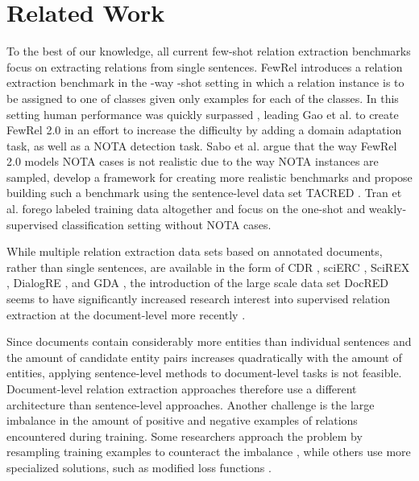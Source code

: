 \documentclass[11pt]{article}
\begin{document}
\section{Related Work}
\label{sec:related_work}

To the best of our knowledge, all current few-shot relation extraction benchmarks \cite{han_fewrel_2018, gao_fewrel_2019, sabo_revisiting_2021} focus on extracting relations from single sentences. 
FewRel \cite{han_fewrel_2018} introduces a relation extraction benchmark in the -way -shot setting \cite{vinyals_matching_2016,snell_prototypical_2017} in which a relation instance is to be assigned to one of  classes given only  examples for each of the classes.
In this setting human performance was quickly surpassed \cite{soares_matching_2019}, leading Gao et al. \cite{gao_fewrel_2019} to create FewRel 2.0 in an effort to increase the difficulty by adding a domain adaptation task, as well as a NOTA detection task. 
Sabo et al. \cite{sabo_revisiting_2021} argue that the way FewRel 2.0 models NOTA cases is not realistic due to the way NOTA instances are sampled, develop a framework for creating more realistic benchmarks and propose building such a benchmark using the sentence-level data set TACRED \cite{zhang_position-aware_2017}.
Tran et al. \cite{tran_one-shot_2021} forego labeled training data altogether and focus on the one-shot and weakly-supervised classification setting without NOTA cases.


While multiple relation extraction data sets based on annotated documents, rather than single sentences, are available in the form of CDR \cite{li_biocreative_2016}, sciERC \cite{luan_multi-task_2018}, SciREX \cite{jain-etal-2020-scirex}, DialogRE \cite{yu2020dialogue}, and GDA \cite{wu_renet_2019}, the introduction of the large scale data set DocRED \cite{yao_docred_2019} seems to have significantly increased research interest into supervised relation extraction at the document-level more recently \cite{zhou_document-level_2020,zhang_document-level_2021,xu_entity_2021,xiao_sais_2021}.

Since documents contain considerably more entities than individual sentences and the amount of candidate entity pairs increases quadratically with the amount of entities, applying sentence-level methods to document-level tasks is not feasible.
Document-level relation extraction approaches therefore use a different architecture \cite{wang_extracting_2019} than sentence-level approaches.
Another challenge is the large imbalance in the amount of positive and negative examples of relations encountered during training. 
Some researchers approach the problem by resampling training examples to counteract the imbalance \cite{han_novel_2020}, while others use more specialized solutions, such as modified loss functions \cite{zhou_document-level_2020}.
\end{document}
